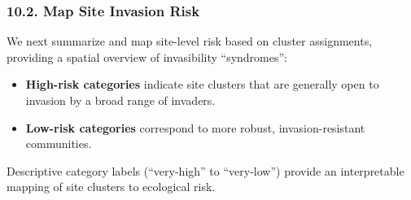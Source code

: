 \documentclass[
]{article}
\providecommand{\tightlist}{%
  \setlength{\itemsep}{0pt}\setlength{\parskip}{0pt}}
\begin{document}
\hypertarget{map-site-invasion-risk}{%
\subsubsection{10.2. Map Site Invasion
Risk}\label{map-site-invasion-risk}}

We next summarize and map site-level risk based on cluster assignments,
providing a spatial overview of invasibility ``syndromes'':

\begin{itemize}
\tightlist
\item
  \textbf{High-risk categories} indicate site clusters that are
  generally open to invasion by a broad range of invaders.
\item
  \textbf{Low-risk categories} correspond to more robust,
  invasion-resistant communities.
\end{itemize}

Descriptive category labels (``very-high'' to ``very-low'') provide an
interpretable mapping of site clusters to ecological risk.
\end{document}
